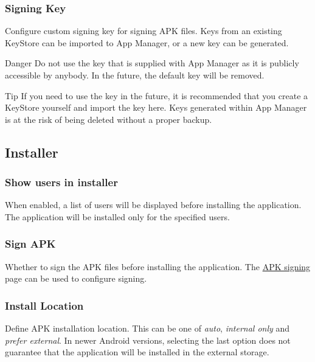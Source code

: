 \subsubsection{Signing Key} %
Configure custom signing key for signing APK files. Keys from an existing KeyStore can be imported to App Manager,
or a new key can be generated.

\begin{danger}{Danger}
    Do not use the key that is supplied with App Manager as it is publicly accessible by anybody. In the future,
    the default key will be removed.
\end{danger}

\begin{tip}{Tip}
    If you need to use the key in the future, it is recommended that you create a KeyStore yourself and import the key
    here. Keys generated within App Manager is at the risk of being deleted without a proper backup.
\end{tip}

\subsection{Installer}\label{subsec:installer} %

\subsubsection{Show users in installer} %
When enabled, a list of users will be displayed before installing the application. The application will be installed
only for the specified users.

\subsubsection{Sign APK} %
Whether to sign the APK files before installing the application. The \hyperref[subsec:apk-signing]{APK signing} page can
be used to configure signing.

\subsubsection{Install Location} %
Define APK installation location. This can be one of \textit{auto}, \textit{internal only} and \textit{prefer external}.
In newer Android versions, selecting the last option does not guarantee that the application will be installed in the external storage.

